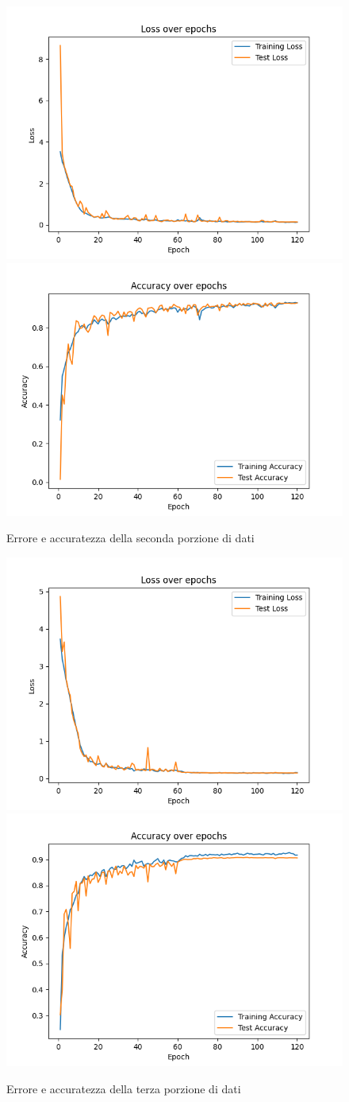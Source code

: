 \begin{figure}
    \centering
    \includegraphics[width=0.4\columnwidth]{Immagini/fold_1_loss.png} \includegraphics[width=0.4\columnwidth]{Immagini/fold_1_accuracy.png}
    \caption{Errore e accuratezza della seconda porzione di dati}
    \label{fig:loss e accuratezza della seconda porzione di dati}
\end{figure}

\begin{figure}
    \centering
    \includegraphics[width=0.4\columnwidth]{Immagini/fold_2_loss.png} \includegraphics[width=0.4\columnwidth]{Immagini/fold_2_accuracy.png}
    \caption{Errore e accuratezza della terza porzione di dati}
    \label{fig:loss e accuratezza della terza porzione di dati}
\end{figure}

